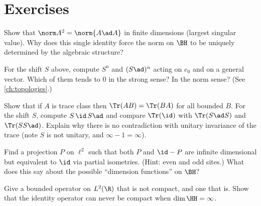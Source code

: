 \section*{Exercises}
\begin{exercise}
Show that $\norm A^2=\norm{A\ad A}$ in finite dimensions (largest singular value). Why does this single identity force the norm on $\BH$ to be uniquely determined by the algebraic structure?
\end{exercise}
\begin{exercise}
For the shift $S$ above, compute $S^n$ and $(S\ad)^n$ acting on $e_0$ and on a general vector. Which of them tends to $0$ in the strong sense? In the norm sense? (See \cref{ch:topologies}.)
\end{exercise}
\begin{exercise}
Show that if $A$ is trace class then $\Tr(AB)=\Tr(BA)$ for all bounded $B$. For the shift $S$, compute $S\,\id\,S\ad$ and compare $\Tr(\id)$ with $\Tr(S\ad S)$ and $\Tr(SS\ad)$. Explain why there is no contradiction with unitary invariance of the trace (note $S$ is not unitary, and $\infty-1=\infty$).
\end{exercise}
\begin{exercise}
Find a projection $P$ on $\ell^2$ such that both $P$ and $\id-P$ are infinite dimensional but equivalent to $\id$ via partial isometries. (Hint: even and odd sites.) What does this say about the possible ``dimension functions'' on $\BH$?
\end{exercise}
\begin{exercise}
Give a bounded operator on $L^2(\R)$ that is not compact, and one that is. Show that the identity operator can never be compact when $\dim\HH=\infty$.
\end{exercise}
